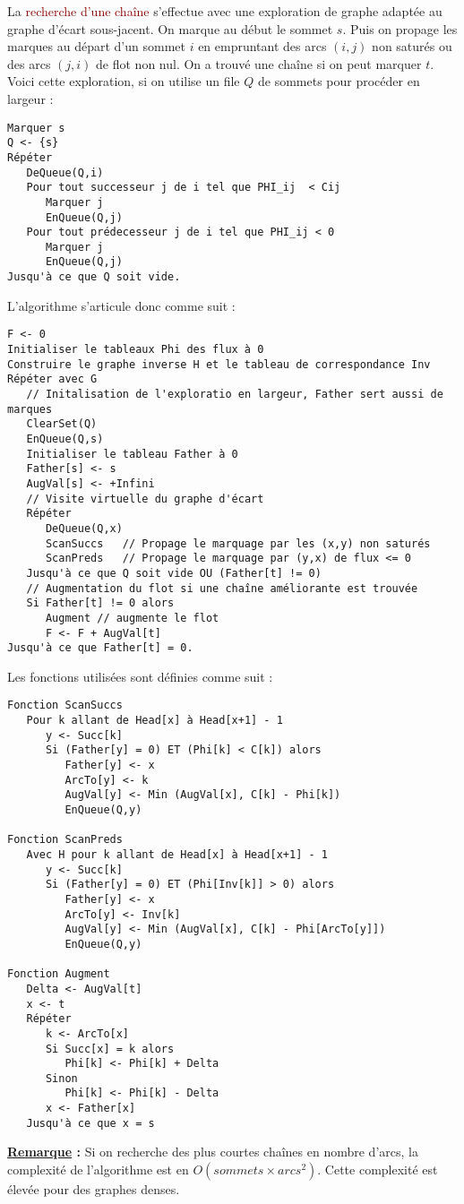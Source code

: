 \documentclass{article}
\newcommand{\red}[1]{\textcolor{darkred}{#1}}
\begin{document}
La \red{recherche d’une chaîne} s’effectue avec une exploration de graphe adaptée au graphe d’écart sous-jacent. On marque au début le sommet $s$. Puis on propage les marques 
au départ d’un sommet $i$ en empruntant des arcs $(i,j)$ non saturés ou des arcs $(j,i)$ de flot non nul. On a trouvé une chaîne si on peut marquer $t$. Voici cette exploration, si 
on utilise un file $Q$ de sommets pour procéder en largeur :
\begin{verbatim}
Marquer s
Q <- {s}
Répéter
   DeQueue(Q,i)
   Pour tout successeur j de i tel que PHI_ij  < Cij
      Marquer j
      EnQueue(Q,j)
   Pour tout prédecesseur j de i tel que PHI_ij < 0
      Marquer j
      EnQueue(Q,j)
Jusqu'à ce que Q soit vide.
\end{verbatim}
L'algorithme s'articule donc comme suit :
\begin{verbatim}
F <- 0
Initialiser le tableaux Phi des flux à 0
Construire le graphe inverse H et le tableau de correspondance Inv
Répéter avec G
   // Initalisation de l'exploratio en largeur, Father sert aussi de marques
   ClearSet(Q)
   EnQueue(Q,s)
   Initialiser le tableau Father à 0
   Father[s] <- s
   AugVal[s] <- +Infini
   // Visite virtuelle du graphe d'écart 
   Répéter
      DeQueue(Q,x)
      ScanSuccs   // Propage le marquage par les (x,y) non saturés
      ScanPreds   // Propage le marquage par (y,x) de flux <= 0
   Jusqu'à ce que Q soit vide OU (Father[t] != 0)
   // Augmentation du flot si une chaîne améliorante est trouvée
   Si Father[t] != 0 alors
      Augment // augmente le flot
      F <- F + AugVal[t]
Jusqu'à ce que Father[t] = 0.
\end{verbatim}
\noindent Les fonctions utilisées sont définies comme suit : 
\begin{verbatim}
Fonction ScanSuccs
   Pour k allant de Head[x] à Head[x+1] - 1
      y <- Succ[k]
      Si (Father[y] = 0) ET (Phi[k] < C[k]) alors
         Father[y] <- x
         ArcTo[y] <- k
         AugVal[y] <- Min (AugVal[x], C[k] - Phi[k])
         EnQueue(Q,y)
         
Fonction ScanPreds
   Avec H pour k allant de Head[x] à Head[x+1] - 1
      y <- Succ[k]
      Si (Father[y] = 0) ET (Phi[Inv[k]] > 0) alors
         Father[y] <- x
         ArcTo[y] <- Inv[k]
         AugVal[y] <- Min (AugVal[x], C[k] - Phi[ArcTo[y]])
         EnQueue(Q,y)

Fonction Augment
   Delta <- AugVal[t]
   x <- t
   Répéter
      k <- ArcTo[x]
      Si Succ[x] = k alors
         Phi[k] <- Phi[k] + Delta
      Sinon
         Phi[k] <- Phi[k] - Delta
      x <- Father[x]
   Jusqu'à ce que x = s
\end{verbatim}
\textbf{\underline{Remarque} :} Si on recherche des plus courtes chaînes en nombre d’arcs, la complexité de l’algorithme est en $O(sommets \times arcs^2)$. Cette complexité 
est élevée pour des graphes denses.
\end{document}
